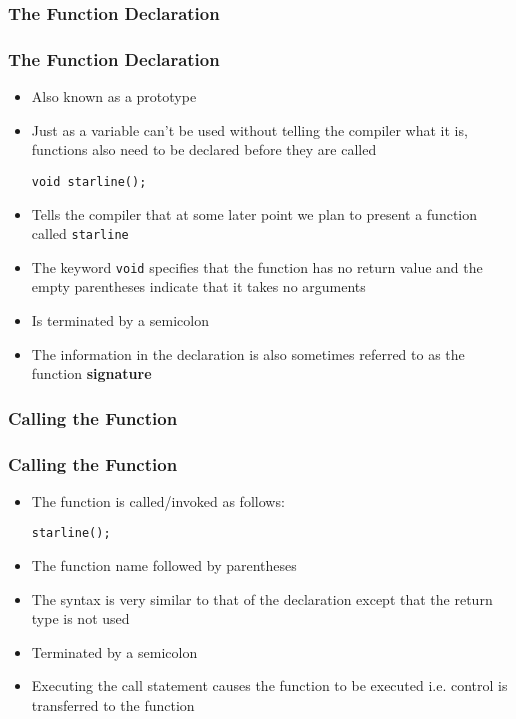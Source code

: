 \documentclass{beamer}
\begin{document}
\begin{frame}[fragile]
    \frametitle{The Function Declaration}
    \subsubsection{The Function Declaration} %
    \label{ssub:the_function_declaration}
    \begin{itemize}
        \item Also known as a prototype
        \item Just as a variable can't be used without telling the compiler what it is, functions also need to be declared before they are called
        \lstset{style=mystyle}
\begin{lstlisting}
void starline();
\end{lstlisting}
    \item Tells the compiler that at some later point we plan to present a function called \texttt{starline}
    \item The keyword \texttt{void} specifies that the function has no return value and the empty parentheses indicate that it takes no arguments
    \item Is terminated by a semicolon
    \item The information in the declaration is also sometimes referred to as the function \textbf{signature}
    \end{itemize}
\end{frame}

\begin{frame}[fragile]
    \frametitle{Calling the Function}
    \subsubsection{Calling the Function} %
    \label{ssub:calling_the_function}
    \begin{itemize}
        \item The function is called/invoked as follows:
        \lstset{style=mystyle}
\begin{lstlisting}
starline();
\end{lstlisting}
    \item The function name followed by parentheses
    \item The syntax is very similar to that of the declaration except that the return type is not used
    \item Terminated by a semicolon
    \item Executing the call statement causes the function to be executed i.e. control is transferred to the function
    \end{itemize}
\end{frame}
\end{document}
